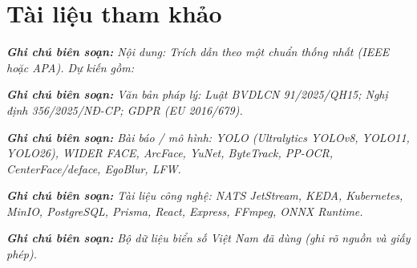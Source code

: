 \documentclass[a4paper,12pt]{article}
\begin{document}
\clearpage
\section*{Tài liệu tham khảo}

{\small\itshape\noindent\textbf{Ghi chú biên soạn:} Nội dung: Trích dẫn theo một chuẩn thống nhất (IEEE hoặc APA). Dự kiến gồm:\par\vspace{6pt}}

{\small\itshape\noindent\textbf{Ghi chú biên soạn:} Văn bản pháp lý: Luật BVDLCN 91/2025/QH15; Nghị định 356/2025/NĐ-CP; GDPR (EU 2016/679).\par\vspace{6pt}}

{\small\itshape\noindent\textbf{Ghi chú biên soạn:} Bài báo / mô hình: YOLO (Ultralytics YOLOv8, YOLO11, YOLO26), WIDER FACE, ArcFace, YuNet, ByteTrack, PP-OCR, CenterFace/deface, EgoBlur, LFW.\par\vspace{6pt}}

{\small\itshape\noindent\textbf{Ghi chú biên soạn:} Tài liệu công nghệ: NATS JetStream, KEDA, Kubernetes, MinIO, PostgreSQL, Prisma, React, Express, FFmpeg, ONNX Runtime.\par\vspace{6pt}}

{\small\itshape\noindent\textbf{Ghi chú biên soạn:} Bộ dữ liệu biển số Việt Nam đã dùng (ghi rõ nguồn và giấy phép).\par\vspace{6pt}}
\end{document}
